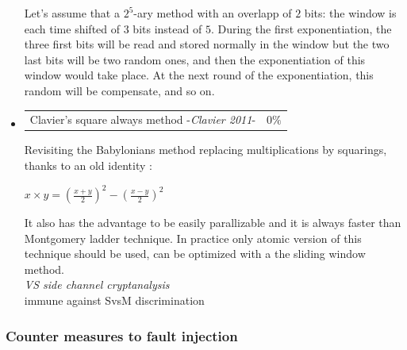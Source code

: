 \begin{itemize}
Let's assume that a $2^5$-ary method with an overlapp of $2$ bits: the window is each time shifted of $3$ 
bits instead of $5$. 
During the first exponentiation, the three first bits will be read and stored normally in the window but the two last bits will be two random ones,
and then the exponentiation of this window would take place.
At the next round of the exponentiation, this random will be compensate, and so on.

	
	  \item	\begin{tabularx}{\linewidth}{ p{16cm} p{1.5cm}}
			Clavier's square always method -\textit{Clavier 2011}-  & $0\%$ \\ 
			\end{tabularx}	
			\noindent
			Revisiting the Babylonians method replacing multiplications by squarings, thanks to 
			an old identity :
			\begin{center}			
				$x \times y = (\frac{x+y}{2})^2-(\frac{x-y}{2})^2$
			\end{center}
			It also has the advantage to be easily parallizable
			and it is always faster than Montgomery ladder technique. 
			In practice only atomic version of this technique should be used,
			can be optimized with a the sliding window method.
			\\

			\vspace{5mm}
			\textit{VS side channel cryptanalysis}\\
			immune against SvsM discrimination
			\vspace{5mm}
\end{itemize}





\subsubsection{Counter measures to fault injection}

